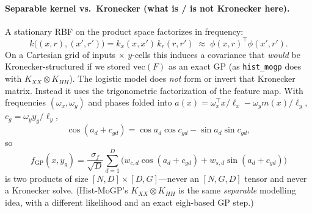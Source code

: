 \documentclass[11pt,a4paper]{article}
\theoremstyle{definition}
\begin{document}
\paragraph{Separable kernel vs.\ Kronecker (what is / is not Kronecker here).}
A stationary RBF on the product space factorizes in frequency:
\begin{equation}
  k\bigl((x,r),(x',r')\bigr)
  =
  k_x(x,x')\,k_r(r,r')
  \;\approx\;
  \phi(x,r)^\top\phi(x',r').
\end{equation}
On a Cartesian grid of inputs $\times$ $y$-cells this induces a covariance that
\emph{would} be Kronecker-structured if we stored $\mathrm{vec}(F)$ as an
exact GP (as \texttt{hist\_mogp} does with $K_{XX}\otimes K_{HH}$).
The logistic model does \emph{not} form or invert that Kronecker matrix.
Instead it uses the trigonometric factorization of the feature map.
With frequencies $(\omega_x,\omega_y)$ and phases folded into
$a(x)=\omega_x^\top x/\ell_x-\omega_y m(x)/\ell_y$,
$c_g=\omega_y y_g/\ell_y$,
\begin{equation}
  \cos(a_d+c_{gd})
  =
  \cos a_d\cos c_{gd}-\sin a_d\sin c_{gd},
\end{equation}
so
\begin{equation}
  f_{\mathrm{GP}}(x,y_g)
  =
  \frac{\sigma_f}{\sqrt{D}}
  \sum_{d=1}^{D}
  \bigl(
    w_{c,d}\cos(a_d+c_{gd})
    +
    w_{s,d}\sin(a_d+c_{gd})
  \bigr)
\end{equation}
is two products of size $[N,D]\times[D,G]$---never an $[N,G,D]$ tensor and never
a Kronecker solve. (Hist-MoGP's $K_{XX}\otimes K_{HH}$ is the same
\emph{separable} modelling idea, with a different likelihood and an exact
eigh-based GP step.)
\end{document}
